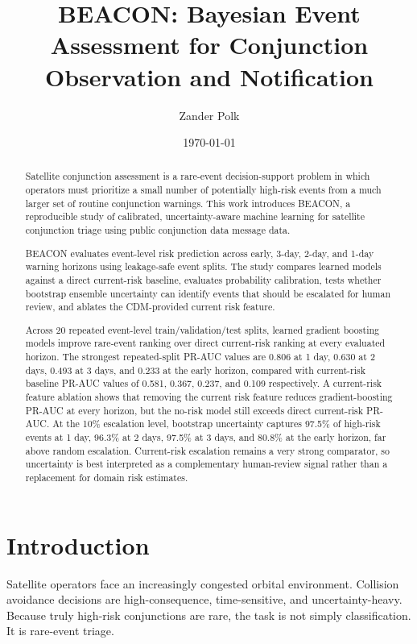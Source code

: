 \documentclass[11pt]{article}
\title{BEACON: Bayesian Event Assessment for Conjunction Observation and Notification}
\author{Zander Polk}
\date{\today}
\begin{document}
\maketitle

\begin{abstract}
Satellite conjunction assessment is a rare-event decision-support problem in which operators must prioritize a small number of potentially high-risk events from a much larger set of routine conjunction warnings. This work introduces BEACON, a reproducible study of calibrated, uncertainty-aware machine learning for satellite conjunction triage using public conjunction data message data.

BEACON evaluates event-level risk prediction across early, 3-day, 2-day, and 1-day warning horizons using leakage-safe event splits. The study compares learned models against a direct current-risk baseline, evaluates probability calibration, tests whether bootstrap ensemble uncertainty can identify events that should be escalated for human review, and ablates the CDM-provided current risk feature.

Across 20 repeated event-level train/validation/test splits, learned gradient boosting models improve rare-event ranking over direct current-risk ranking at every evaluated horizon. The strongest repeated-split PR-AUC values are 0.806 at 1 day, 0.630 at 2 days, 0.493 at 3 days, and 0.233 at the early horizon, compared with current-risk baseline PR-AUC values of 0.581, 0.367, 0.237, and 0.109 respectively. A current-risk feature ablation shows that removing the current risk feature reduces gradient-boosting PR-AUC at every horizon, but the no-risk model still exceeds direct current-risk PR-AUC. At the 10\% escalation level, bootstrap uncertainty captures 97.5\% of high-risk events at 1 day, 96.3\% at 2 days, 97.5\% at 3 days, and 80.8\% at the early horizon, far above random escalation. Current-risk escalation remains a very strong comparator, so uncertainty is best interpreted as a complementary human-review signal rather than a replacement for domain risk estimates.
\end{abstract}

\section{Introduction}

Satellite operators face an increasingly congested orbital environment. Collision avoidance decisions are high-consequence, time-sensitive, and uncertainty-heavy. Because truly high-risk conjunctions are rare, the task is not simply classification. It is rare-event triage.
\end{document}
